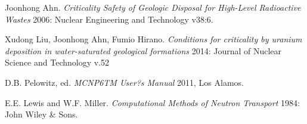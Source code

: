 \documentclass[11pt, oneside]{article}   	%
\begin{document}
\begin{thebibliography}{1}

   Joonhong Ahn. {\em Criticality Safety of Geologic Disposal for High-Level Radioactive Wastes} 2006: Nuclear Engineering and Technology v38:6.

   Xudong Liu, Joonhong Ahn, Fumio Hirano. {\em Conditions for criticality by uranium deposition in water-saturated geological formations} 2014: Journal of Nuclear Science and Technology v.52
   
    D.B. Pelowitz, ed. {\em MCNP6TM User?s Manual} 2011, Los Alamos.
   
    E.E. Lewis and W.F. Miller. {\em Computational Methods of Neutron Transport} 1984: John Wiley \& Sons.
   
\end{thebibliography}
\end{document}

